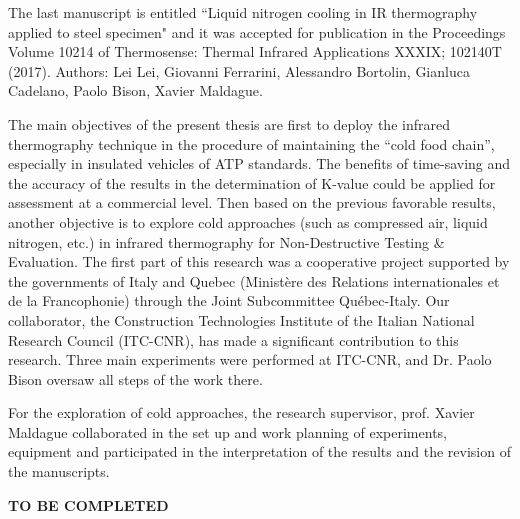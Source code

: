 The last manuscript is entitled ``Liquid nitrogen cooling in IR thermography applied to steel specimen" and it was accepted for publication in the Proceedings Volume 10214 of Thermosense: Thermal Infrared Applications XXXIX; 102140T (2017). Authors: Lei Lei, Giovanni Ferrarini, Alessandro Bortolin, Gianluca Cadelano, Paolo Bison, Xavier Maldague.

The main objectives of the present thesis are first to deploy the infrared thermography technique in the procedure of maintaining the ``cold food chain'', especially in insulated vehicles of ATP standards. The benefits of time-saving and the accuracy of the results in the determination of K-value could be applied for assessment at a commercial level. Then based on the previous favorable results, another objective is to explore cold approaches (such as compressed air, liquid nitrogen, etc.) in infrared thermography for Non-Destructive Testing \& Evaluation. The first part of this research was a cooperative project supported by the governments of Italy and Quebec (Ministère des Relations internationales et de la Francophonie) through the Joint Subcommittee Québec-Italy. Our collaborator, the Construction Technologies Institute of the Italian National Research Council (ITC-CNR), has made a significant contribution to this research. Three main experiments were performed at ITC-CNR, and Dr. Paolo Bison oversaw all steps of the work there.

For the exploration of cold approaches, the research supervisor, prof. Xavier Maldague collaborated in the set up and work planning of experiments, equipment and participated in the interpretation of the results and the revision of the manuscripts.

\textbf{TO BE COMPLETED}


